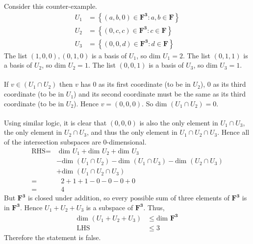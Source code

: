 \documentclass[a4paper]{article}
\begin{document}
\Large
Consider this counter-example.
\begin{align*}
    U_1 &= \left\{ (a, b, 0) \in \mathbf{F^3} : a, b \in \mathbf{F} \right\} \\
    U_2 &= \left\{ (0, c, c) \in \mathbf{F^3} : c \in \mathbf{F} \right\} \\
    U_3 &= \left\{ (0, 0, d) \in \mathbf{F^3} : d \in \mathbf{F} \right\} 
\end{align*}
The list $(1,0,0), (0,1,0)$ is a basis of $U_1$, so dim $U_1 = 2$.
The list $(0,1,1)$ is a basis of $U_2$, so dim $U_2 = 1$.
The list $(0,0,1)$ is a basis of $U_3$, so dim $U_3 = 1$.
\\
\\
If $v \in (U_1\cap U_2)$ then $v$ has 0 as its first coordinate (to be in $U_2$), 0 as its third coordinate (to be in $U_1$) and its second coordinate must be the same as its third coordinate (to be in $U_2$).
Hence $v = (0, 0, 0)$.
So dim $(U_1\cap U_2) = 0$.
\\
\\
Using similar logic, it is clear that $(0, 0, 0)$ is also the only element in $U_1\cap U_3$, the only element in $U_2\cap U_3$, and thus the only element in $U_1\cap U_2\cap U_3$.
Hence all of the intersection subspaces are 0-dimensional.
\begin{align*}
 \text{RHS} = &\text{ dim }U_1 + \text{dim }U_2 + \text{dim }U_3 \\
        &- \text{dim }(U_1 \cap U_2) - \text{dim }(U_1 \cap U_3) - \text{dim }(U_2 \cap U_3) \\
        &+ \text{dim }(U_1 \cap U_2 \cap U_3)
\\
   = &\text{ }2 + 1 + 1 - 0 - 0 - 0 + 0 \\
   = &\text{ }4
\end{align*}
But $\mathbf{F^3}$ is closed under addition, so every possible sum of three elements of $\mathbf{F^3}$ is in $\mathbf{F^3}$.
Hence $U_1 + U_2 + U_3$ is a subspace of $\mathbf{F^3}$.
Thus,
\begin{align*}
    \text{dim }(U_1 + U_2 + U_3) &\le \text{dim }\mathbf{F^3} \\
    \text{LHS } &\le 3
\end{align*}
Therefore the statement is false.
\end{document}
